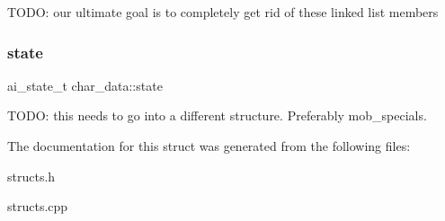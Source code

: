 T\+O\+DO\+: our ultimate goal is to completely get rid of these linked list members \mbox{\label{structchar__data_a551436fec9d0b71ed20243feee1a685e}} 
\subsubsection{\texorpdfstring{state}{state}}
{\footnotesize\ttfamily ai\+\_\+state\+\_\+t char\+\_\+data\+::state}

T\+O\+DO\+: this needs to go into a different structure. Preferably mob\+\_\+specials. 

The documentation for this struct was generated from the following files\+:\begin{DoxyCompactItemize}
\item 
structs.\+h\item 
structs.\+cpp\end{DoxyCompactItemize}
